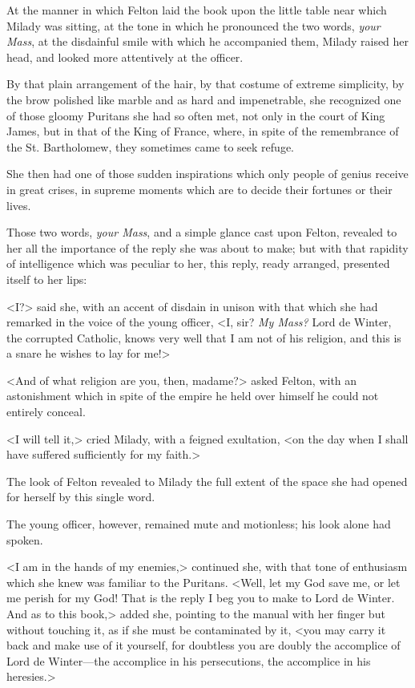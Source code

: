 At the manner in which Felton laid the book upon the little table near which Milady was sitting, at the tone in which he pronounced the two words, \textit{your Mass}, at the disdainful smile with which he accompanied them, Milady raised her head, and looked more attentively at the officer. 

By that plain arrangement of the hair, by that costume of extreme simplicity, by the brow polished like marble and as hard and impenetrable, she recognized one of those gloomy Puritans she had so often met, not only in the court of King James, but in that of the King of France, where, in spite of the remembrance of the St. Bartholomew, they sometimes came to seek refuge. 

She then had one of those sudden inspirations which only people of genius receive in great crises, in supreme moments which are to decide their fortunes or their lives. 

Those two words, \textit{your Mass}, and a simple glance cast upon Felton, revealed to her all the importance of the reply she was about to make; but with that rapidity of intelligence which was peculiar to her, this reply, ready arranged, presented itself to her lips: 

<I?> said she, with an accent of disdain in unison with that which she had remarked in the voice of the young officer, <I, sir? \textit{My Mass?} Lord de Winter, the corrupted Catholic, knows very well that I am not of his religion, and this is a snare he wishes to lay for me!> 

<And of what religion are you, then, madame?> asked Felton, with an astonishment which in spite of the empire he held over himself he could not entirely conceal. 

<I will tell it,> cried Milady, with a feigned exultation, <on the day when I shall have suffered sufficiently for my faith.> 

The look of Felton revealed to Milady the full extent of the space she had opened for herself by this single word. 

The young officer, however, remained mute and motionless; his look alone had spoken. 

<I am in the hands of my enemies,> continued she, with that tone of enthusiasm which she knew was familiar to the Puritans. <Well, let my God save me, or let me perish for my God! That is the reply I beg you to make to Lord de Winter. And as to this book,> added she, pointing to the manual with her finger but without touching it, as if she must be contaminated by it, <you may carry it back and make use of it yourself, for doubtless you are doubly the accomplice of Lord de Winter---the accomplice in his persecutions, the accomplice in his heresies.> 

